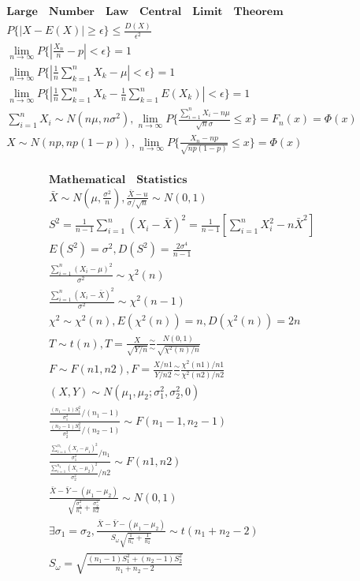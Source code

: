 \documentclass{article}
\begin{document}
\begin{align*}
    \bm{Large \quad Number \quad Law \quad Central \quad Limit \quad Theorem } \\ 
    P \{ {|X-E(X)|\ge \epsilon} \} \le \frac{D(X)}{\epsilon^{2}} \\
    \lim_{n \to \infty}P\{|\frac{X_{n}}{n}-p| < \epsilon\} = 1 \\
    \lim_{n \to \infty}P\{|\frac{1}{n}\sum_{k=1}^nX_{k}-\mu|<\epsilon\} = 1 \\
    \lim_{n \to \infty}P\{|\frac{1}{n}\sum_{k=1}^n X_{k} - \frac{1}{n}\sum_{k=1}^n E(X_{k})| < \epsilon\} = 1 \\ 
    \sum_{i=1}^{n}X_{i} \sim N(n\mu,n\sigma^2), \lim_{n \to \infty}P\{\frac{\sum_{i=1}^nX_{i}-n\mu}{\sqrt{n}\sigma} \le x\} = F_{n}(x) = \Phi(x) \\ 
    X \sim N(np,np(1-p)), \lim_{n \to \infty }P\{\frac{X_{n}-np}{\sqrt{np(1-p)}} \le x \} = \Phi(x) \\ 
\end{align*}

\clearpage
\begin{align*}
    \bm{Mathematical \quad Statistics} \\ 
    \bar{X} \sim N(\mu,\frac{\sigma^2}{n}), \frac{\bar{X}-u}{\sigma/\sqrt{n}} \sim N(0,1)\\ 
    S^2 = \frac{1}{n-1}\sum_{i=1}^n(X_{i}-\bar{X})^2 = \frac{1}{n-1}[\sum_{i=1}^nX_{i}^2 - n \bar{X}^2] \\ 
    E(S^2) = \sigma^2, D(S^2) = \frac{2\sigma^4}{n-1} \\ 
    \frac{\sum_{i=1}^n(X_{i}-\mu)^2}{\sigma^2} \sim \chi^2(n) \\ 
    \frac{\sum_{i=1}^n(X_{i}-\bar{X})^2}{\sigma^2} \sim \chi^2(n-1) \\ 
    \chi^2 \sim \chi^2(n), E(\chi^2(n)) = n, D(\chi^2(n)) = 2n \\ 
    T \sim t(n), T = \frac{X}{\sqrt{Y/n}} \frac{\sim}{\sim} \frac{N(0,1)}{\sqrt{\chi^2(n)/n}}\\
    F \sim F(n1,n2), F = \frac{X/n1}{Y/n2} \frac{\sim}{\sim} \frac{\chi^2(n1)/n1}{\chi^2(n2)/n2} \\ 
    (X,Y) \sim N(\mu_{1},\mu_{2};\sigma_{1}^2,\sigma_{2}^2,0) \\ 
    \frac{\frac{(n_{1}-1)S_{1}^2}{\sigma_{1}^2}/(n_{1}-1)}{\frac{(n_{2}-1)S_{2}^2}{\sigma_{2}^2}/(n_{2}-1)} \sim F(n_{1}-1,n_{2}-1) \\
    \frac{\frac{\sum_{i=1}^{n_{1}}(X_{i}-\mu_{1})^2}{\sigma_{1}^2}/n_{1}}{\frac{\sum_{i=1}^{n_{2}}(X_{i}-\mu_{2})^2}{\sigma_{2}^2}/n2} \sim F(n1,n2) \\  
    \frac{\bar{X}-\bar{Y}-(\mu_{1}-\mu_{2})}{\sqrt{\frac{\sigma_{1}^2}{n_{1}}+\frac{\sigma_{2}^2}{n2}}} \sim N(0,1) \\ 
    \exists \sigma_{1} = \sigma_{2}, \frac{\bar{X}-\bar{Y}-(\mu_{1}-\mu_{2})}{S_{\omega}\sqrt{\frac{1}{n_{1}}+\frac{1}{n_{2}}}} \sim t(n_{1}+n_{2}-2) \\ 
    S_{\omega} = \sqrt{\frac{(n_{1}-1)S_{1}^2+(n_{2}-1)S_{2}^2 }{n_{1}+n_{2}-2}}
\end{align*}
\end{document}
